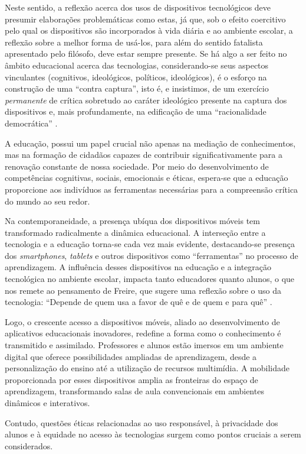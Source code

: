 \documentclass[portuguese]{textolivre}
\begin{document}
Neste sentido, a reflexão acerca dos usos de dispositivos tecnológicos deve presumir elaborações problemáticas como estas, já que, sob o efeito coercitivo pelo qual os dispositivos são incorporados à vida diária e ao ambiente escolar, a reflexão sobre a melhor forma de usá-los, para além do sentido fatalista apresentado pelo filósofo, deve estar sempre presente. Se há algo a ser feito no âmbito educacional acerca das tecnologias, considerando-se seus aspectos vinculantes (cognitivos, ideológicos, políticos, ideológicos), é o esforço na construção de uma “contra captura”, isto é, e insistimos, de um exercício \textit{permanente} de crítica sobretudo ao caráter ideológico presente na captura dos dispositivos e, mais profundamente, na edificação de uma “racionalidade democrática” \cite{feenberg_tecnologia_2018}.

A educação, possui um papel crucial não apenas na mediação de conhecimentos, mas na formação de cidadãos capazes de contribuir significativamente para a renovação constante de nossa sociedade. Por meio do desenvolvimento de competências cognitivas, sociais, emocionais e éticas, espera-se que a educação proporcione aos indivíduos as ferramentas necessárias para a compreensão crítica do mundo ao seu redor.

Na contemporaneidade, a presença ubíqua dos dispositivos móveis tem transformado radicalmente a dinâmica educacional. A interseção entre a tecnologia e a educação torna-se cada vez mais evidente, destacando-se presença dos \textit{smartphones}, \textit{tablets} e outros dispositivos como “ferramentas” no processo de aprendizagem. A influência desses dispositivos na educação e a integração tecnológica no ambiente escolar, impacta tanto educadores quanto alunos, o que nos remete ao pensamento de Freire, que sugere uma reflexão sobre o uso da tecnologia: “Depende de quem usa a favor de quê e de quem e para quê” \cite[p. 98]{freire_conversacao_1994}.

Logo, o crescente acesso a dispositivos móveis, aliado ao desenvolvimento de aplicativos educacionais inovadores, redefine a forma como o conhecimento é transmitido e assimilado. Professores e alunos estão imersos em um ambiente digital que oferece possibilidades ampliadas de aprendizagem, desde a personalização do ensino até a utilização de recursos multimídia. A mobilidade proporcionada por esses dispositivos amplia as fronteiras do espaço de aprendizagem, transformando salas de aula convencionais em ambientes dinâmicos e interativos.

Contudo, questões éticas relacionadas ao uso responsável, à privacidade dos alunos e à equidade no acesso às tecnologias surgem como pontos cruciais a serem considerados.
\end{document}
